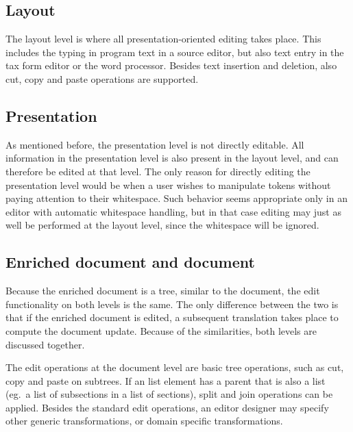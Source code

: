  
%																
\subsection{Layout}

The layout level is where all presentation-oriented editing takes place. This includes the typing in program text in a source editor, but also text entry in the tax form editor or the word processor. Besides text insertion and deletion, also cut, copy and paste operations are supported.
 
%																
\subsection{Presentation}

As mentioned before, the presentation level is not directly editable. All information in the presentation level is also present in the layout level, and can therefore be edited at that level. The only reason for directly editing the presentation level would be when a user wishes to manipulate tokens without paying attention to their whitespace. Such behavior seems appropriate only in an editor with automatic whitespace handling, but in that case editing may just as well be performed at the layout level, since the whitespace will be ignored. 
 
 
%																
\subsection{Enriched document and document}

Because the enriched document is a tree, similar to the document, the edit functionality on both levels is the same. The only difference between the two is that if the enriched document is edited, a subsequent translation takes place to compute the document update. Because of the similarities, both levels are discussed together.

The edit operations at the document level are basic tree operations, such as cut, copy and paste on subtrees. If an list element has a parent that is also a list (eg.\ a list of subsections in a list of sections), split and join operations can be applied. Besides the standard edit operations, an editor designer may specify other generic transformations, or domain specific transformations.

